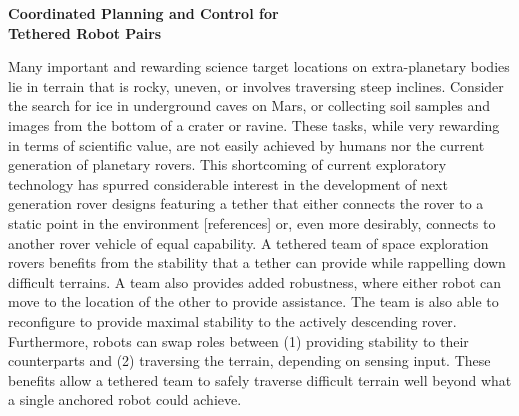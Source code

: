 \documentclass[12pt]{article}
\newcommand{\kostas}[1]{{\color{blue} #1}}
\begin{document}
\newpage

\begin{center}
{\bf Coordinated Planning and Control for \\ Tethered Robot Pairs }

\end{center}
\vspace{-.1in}


 Many important and rewarding science
target locations on extra-planetary bodies lie in terrain that is
rocky, uneven, or involves traversing steep inclines. Consider the
search for ice in underground caves on Mars, or collecting soil
samples and images from the bottom of a crater or ravine.  These
tasks, while very rewarding in terms of scientific value, are not
easily achieved by humans nor the current generation of planetary
rovers. This shortcoming of current exploratory technology has spurred
considerable interest in the development of next generation rover
designs featuring a tether that either connects the rover to a static
point in the environment \kostas{[references]} or, even more
desirably, connects to another rover vehicle of equal capability. A
tethered team of space exploration rovers benefits from the stability
that a tether can provide while rappelling down difficult terrains.  A
team also provides added robustness, where either robot can move to
the location of the other to provide assistance. The team is also 
able to reconfigure to provide maximal stability to the actively 
descending rover. Furthermore, robots can swap roles between (1)
providing stability to their counterparts and (2) traversing the terrain,
depending on sensing input. These benefits allow a tethered team to safely
traverse difficult terrain well beyond what a single anchored robot
could achieve.
\end{document}
